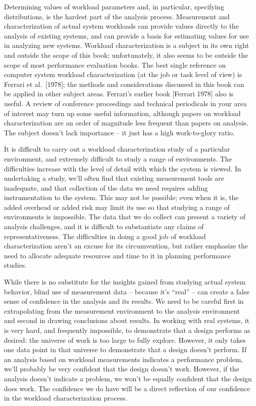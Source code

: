 Determining values of workload parameters and, in particular, specifying
distributions, is the hardest part of the analysis process. Measurement and
characterization of actual system workloads can provide values directly to the
analysis of existing systems, and can provide a basis for estimating values for
use in analyzing new systems. Workload characterization is a subject in its
own right and outside the scope of this book; unfortunately, it also seems to
be outside the scope of most performance evaluation books. The best single
reference on computer system workload characterization (at the job or task
level of view) is Ferrari et al.\ [1978]; the methods and considerations
 discussed in this book can be applied in other subject areas. Ferrari's
earlier book [Ferrari 1978] also is useful. A review of conference proceedings
and technical periodicals in your area of interest may turn up some useful
information, although papers on workload characterization are an order of
magnitude less frequent than papers on analysis. The subject doesn't lack
importance -- it just has a high work-to-glory ratio.

It is difficult to carry out a workload characterization study of a particular
environment, and extremely difficult to study a range of environments. The
difficulties increase with the level of detail with which the system is
viewed. In undertaking a study, we'll often find that existing measurement
tools are inadequate, and that collection of the data we need requires adding
instrumentation to the system. This may not be possible; even when it is, the
added overhead or added risk may limit its use so that studying a range of
environments is impossible. The data that we do collect can present a variety
of analysis challenges, and it is difficult to substantiate any claims of
representativeness. The difficulties in doing a good job of workload
characterization aren't an excuse for its circumvention, but rather emphasize
the need to allocate adequate resources and time to it in planning performance
studies.

While there is no substitute for the insights gained from studying actual
system behavior, blind use of measurement data -- because it's ``real'' -- can
create a false sense of confidence in the analysis and its results. We need to
be careful first in extrapolating from the measurement environment to the
analysis environment and second in drawing conclusions about results. In
working with real systems, it is very hard, and frequently impossible, to
demonstrate that a design performs as desired: the universe of work is too
large to fully explore. However, it only takes one data point in that universe
to demonstrate that a design doesn't perform. If an analysis based on workload
measurements indicates a performance problem, we'll probably be very confident
that the design doesn't work. However, if the analysis doesn't indicate a
problem, we won't be equally confident that the design does work. The
confidence we do have will be a direct reflection of our confidence in the
workload characterization process.

